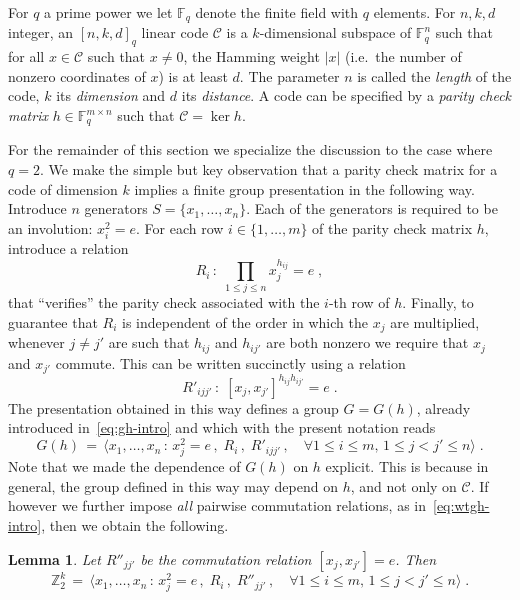 \documentclass[11pt]{article}
\newtheorem{lemma}[theorem]{Lemma}
\theoremstyle{definition}
\newcommand{\code}{\mathscr{C}}
\newcommand{\F}{\ensuremath{\mathbb{F}}}
\newcommand{\Z}{\ensuremath{\mathbb{Z}}}
\begin{document}
\label{sec:pres-code}

For $q$ a prime power we let $\F_q$ denote the finite field with $q$ elements. 
For $n,k,d$ integer, an $[n,k,d]_q$ linear code $\code$ is a $k$-dimensional subspace of $\F_q^n$ such that for all $x\in \code$ such that $x\neq 0$, the Hamming weight $|x|$ (i.e.\ the number of nonzero coordinates of $x$) is at least $d$. The parameter $n$ is called the \emph{length} of the code, $k$ its \emph{dimension} and $d$ its \emph{distance}. A code can be specified by a \emph{parity check matrix} $h\in \F_q^{m\times n}$ such that $\code = \ker h$. 

For the remainder of this section we specialize the discussion to the case where $q=2$. 
We make the simple but key observation that a parity check matrix for a code of dimension $k$ implies a finite group presentation in the following way. Introduce $n$ generators $S=\{x_1,\ldots,x_n\}$. Each of the generators is required to be an involution: $x_i^2=e$. For each row $i\in \{1,\ldots,m\}$ of the parity check matrix $h$, introduce a relation 
\[ R_i\,:\; \prod_{1\leq j \leq n} x_j^{h_{ij}}=e\;, \]
that ``verifies'' the parity check associated with the $i$-th row of $h$. Finally, to guarantee that $R_i$ is independent of the order in which the $x_j$ are multiplied, whenever $j\neq j'$ are such that $h_{ij}$ and $h_{ij'}$ are both nonzero we require that $x_j$ and $x_{j'}$ commute. This can be written succinctly using a relation 
\[ R'_{ijj'}\,:\; [x_j,x_{j'}]^{h_{ij} h_{ij'}}=e\;.\]
The presentation obtained in this way defines a group $G=G(h)$, already introduced in~\eqref{eq:gh-intro} and which with the present notation reads
\begin{equation}\label{eq:def-gh-pres}
 G(h) \,=\, \big\langle x_1,\ldots,x_n \,:\, x_j^2=e\,,\; R_i\,,\; R'_{ijj'}\,,\quad \forall 1\leq i\leq m,\, 1\leq j< j' \leq n\big\rangle\;.
\end{equation}
Note that we made the dependence of $G(h)$ on $h$ explicit. This is because in general, the group defined in this way may depend on $h$, and not only on $\code$. If however we further impose \emph{all} pairwise commutation relations, as in~\eqref{eq:wtgh-intro}, then we obtain the following. 

\begin{lemma}\label{lem:com-code}
Let $R''_{jj'}$ be the commutation relation $[x_j,x_{j'}]=e$. Then
\[ \Z_2^k \,=\, \big\langle x_1,\ldots,x_n \,:\, x_j^2=e\,,\; R_i\,,\; R''_{jj'}\,,\quad \forall 1\leq i\leq m,\, 1\leq j< j' \leq n\big\rangle\;.\]
\end{lemma}
\end{document}
